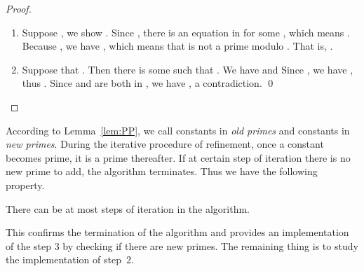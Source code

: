 \documentclass{llncs}
\begin{document}
\begin{proof}
\begin{enumerate}
\item
Suppose , we show .  Since , there is an equation  in   for some , which means . Because  , we have , which means that  is not a prime modulo . That is, .

\item
Suppose that . Then there is some  such that .  We have  and   Since  , we have , thus
 .
Since
 and  are both in , we have  , a contradiction. \qed
\end{enumerate}

\end{proof}


According to Lemma~\ref{lem:PP}, we call constants in  {\em old primes} and constants in 
{\em new primes}.  During the iterative procedure of refinement, once a constant becomes prime, it is a prime thereafter.
If at certain step of iteration there is no new prime to add, the algorithm terminates.  Thus  we have the following property.
\begin{proposition}
There can be at most  steps of iteration in the algorithm.
\end{proposition}
This confirms the termination of the algorithm and provides an implementation of the step 3 by checking if there are new primes. The remaining thing is to study the
implementation of step~2.
\end{document}
